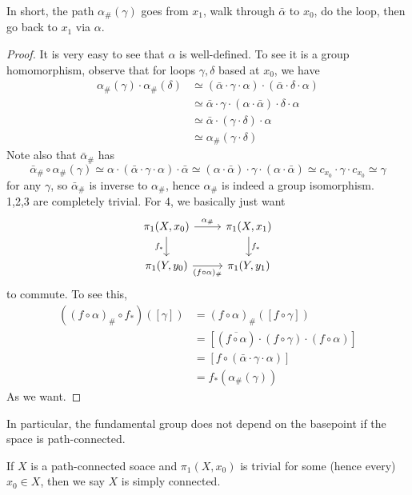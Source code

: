 In short, the path $\alpha_\#(\gamma)$ goes from $x_1$, walk through $\bar\alpha$ to $x_0$, do the loop, then go back to $x_1$ via $\alpha$.
\begin{proof}
    It is very easy to see that $\alpha$ is well-defined.
    To see it is a group homomorphism, observe that for loops $\gamma,\delta$ based at $x_0$, we have
    \begin{align*}
        \alpha_\#(\gamma)\cdot\alpha_\#(\delta)&\simeq(\bar\alpha\cdot\gamma\cdot\alpha)\cdot(\bar\alpha\cdot\delta\cdot\alpha)\\
        &\simeq\bar\alpha\cdot\gamma\cdot(\alpha\cdot\bar\alpha)\cdot\delta\cdot\alpha\\
        &\simeq\bar\alpha\cdot(\gamma\cdot\delta)\cdot \alpha\\
        &\simeq\alpha_\#(\gamma\cdot\delta)
    \end{align*}
    Note also that $\bar\alpha_\#$ has
    $$\bar\alpha_\#\circ\alpha_\#(\gamma)\simeq \alpha\cdot(\bar\alpha\cdot\gamma\cdot\alpha)\cdot\bar\alpha\simeq(\alpha\cdot\bar\alpha)\cdot\gamma\cdot(\alpha\cdot\bar\alpha)\simeq c_{x_0}\cdot\gamma\cdot c_{x_0}\simeq\gamma$$
    for any $\gamma$, so $\bar\alpha_\#$ is inverse to $\alpha_\#$, hence $\alpha_\#$ is indeed a group isomorphism.\\
    1,2,3 are completely trivial.
    For 4, we basically just want
    \[
        \begin{tikzcd}
            \pi_1(X,x_0)\arrow{r}{\alpha_\#}\arrow[swap]{d}{f_\ast}&\pi_1(X,x_1)\arrow{d}{f_\ast}\\
            \pi_1(Y,y_0)\arrow[swap]{r}{(f\circ\alpha)_\#}&\pi_1(Y,y_1)
        \end{tikzcd}
    \]
    to commute.
    To see this,
    \begin{align*}
        ((f\circ\alpha)_\#\circ f_\ast)([\gamma])&=(f\circ\alpha)_\#([f\circ\gamma])\\
        &=[(\overline{f\circ\alpha})\cdot(f\circ\gamma)\cdot (f\circ\alpha)]\\
        &=[f\circ(\bar\alpha\cdot\gamma\cdot\alpha)]\\
        &=f_\ast(\alpha_\#(\gamma))
    \end{align*}
    As we want.
\end{proof}
In particular, the fundamental group does not depend on the basepoint if the space is path-connected.
\begin{definition}
    If $X$ is a path-connected soace and $\pi_1(X,x_0)$ is trivial for some (hence every) $x_0\in X$, then we say $X$ is simply connected.
\end{definition}
